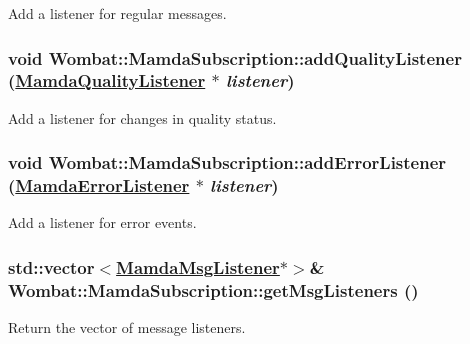 Add a listener for regular messages. 

\hypertarget{classWombat_1_1MamdaSubscription_32cde1bfe1d283e945b5f2c596c668ea}{
\subsubsection[addQualityListener]{\setlength{\rightskip}{0pt plus 5cm}void Wombat::Mamda\-Subscription::add\-Quality\-Listener (\hyperlink{classWombat_1_1MamdaQualityListener}{Mamda\-Quality\-Listener} $\ast$ {\em listener})}}
\label{classWombat_1_1MamdaSubscription_32cde1bfe1d283e945b5f2c596c668ea}


Add a listener for changes in quality status. 

\hypertarget{classWombat_1_1MamdaSubscription_70152491e3c251e1d21b2708e89fa166}{
\subsubsection[addErrorListener]{\setlength{\rightskip}{0pt plus 5cm}void Wombat::Mamda\-Subscription::add\-Error\-Listener (\hyperlink{classWombat_1_1MamdaErrorListener}{Mamda\-Error\-Listener} $\ast$ {\em listener})}}
\label{classWombat_1_1MamdaSubscription_70152491e3c251e1d21b2708e89fa166}


Add a listener for error events. 

\hypertarget{classWombat_1_1MamdaSubscription_691094f8744e5efcd4b7756709cd8c72}{
\subsubsection[getMsgListeners]{\setlength{\rightskip}{0pt plus 5cm}std::vector$<$\hyperlink{classWombat_1_1MamdaMsgListener}{Mamda\-Msg\-Listener}$\ast$$>$\& Wombat::Mamda\-Subscription::get\-Msg\-Listeners ()}}
\label{classWombat_1_1MamdaSubscription_691094f8744e5efcd4b7756709cd8c72}


Return the vector of message listeners. 

